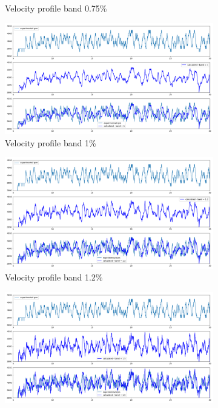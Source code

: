 \documentclass[10pt,fleqn,a4paper,twoside]{article}
\begin{document}
\begin{figure}
\begin{subfigure}{0.4\textwidth}
        \caption{Velocity profile band 0.75\%}
        \label{fig:third}
    \end{subfigure}
    \centering
    \hfill
    \begin{subfigure}{0.4\textwidth}
        \includegraphics[width=\textwidth]{Figures/rpm_analysis_mic0_band_1.png}
        \caption{Velocity profile band 1\%}
        \label{fig:fourth}
    \end{subfigure}
    \centering
    \hfill
    \begin{subfigure}{0.4\textwidth}
        \includegraphics[width=\textwidth]{Figures/rpm_analysis_mic0_band_1.2.png}
        \caption{Velocity profile band 1.2\%}
        \label{fig:fifth}
    \end{subfigure}
    \centering
    \hfill
    \begin{subfigure}{0.4\textwidth}
        \includegraphics[width=\textwidth]{Figures/rpm_analysis_mic0_band_1.5.png}

\end{subfigure}
\end{figure}
\end{document}

